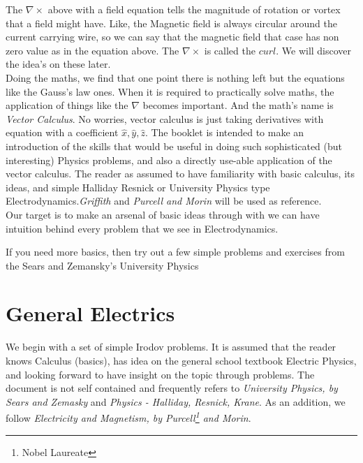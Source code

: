 \documentclass[11pt,a4paper,landscape,twocolumn]{article}
\theoremstyle{definition}
\theoremstyle{definition}
\theoremstyle{definition}
\theoremstyle{definition}
\begin{document}
The $ \nabla \times$ above with a field equation tells the magnitude of rotation or vortex that a field might have. Like, the Magnetic field is always circular around the current carrying wire, so we can say that the magnetic field that case has non zero value as in the equation above. The $\nabla \times$ is called the $curl$. We will discover the idea's on these later. 
\\
Doing the maths, we find that one point there is nothing left but the equations like the Gauss's law ones. When it is required to practically solve maths, the application of things like the $\nabla$ becomes important. And the math's name is \emph{Vector Calculus}. No worries, vector calculus is just taking derivatives with equation with a coefficient $ \hat{x}, \hat{y}, \hat{z}$. The booklet is intended to make an introduction of the skills that would be useful in doing such sophisticated (but interesting) Physics problems, and also a directly use-able application of the vector calculus. The reader as assumed to have familiarity with basic calculus, its ideas, and simple Halliday Resnick or University Physics type Electrodynamics.\emph{Griffith} and \emph{Purcell and Morin} will be used as reference. \\
Our target is to make an arsenal of basic ideas through with we can have intuition behind every problem that we see in Electrodynamics.

If you need more basics, then try out a few simple problems and exercises from the Sears and Zemansky's University Physics

\section{\small{General Electrics}}

We begin with a set of simple Irodov problems. It is assumed that the reader knows Calculus (basics), has idea on the general school textbook Electric Physics, and looking forward to have insight on the topic through problems. The document is not self contained and frequently refers to \emph{University Physics, by Sears and Zemasky} and \emph{Physics - Halliday, Resnick, Krane}. As an addition, we follow \emph{Electricity and Magnetism, by Purcell\footnote{Nobel Laureate} and Morin}.


\end{document}
